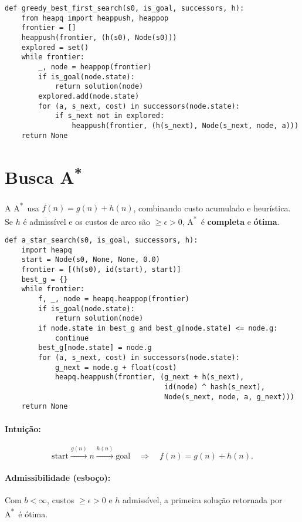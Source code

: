 \documentclass[9pt,a4paper]{extarticle}
\newcommand{\Astar}{A\textsuperscript{*}}
\begin{document}
\begin{lstlisting}
def greedy_best_first_search(s0, is_goal, successors, h):
    from heapq import heappush, heappop
    frontier = []
    heappush(frontier, (h(s0), Node(s0)))
    explored = set()
    while frontier:
        _, node = heappop(frontier)
        if is_goal(node.state):
            return solution(node)
        explored.add(node.state)
        for (a, s_next, cost) in successors(node.state):
            if s_next not in explored:
                heappush(frontier, (h(s_next), Node(s_next, node, a)))
    return None
\end{lstlisting}

\section{Busca \Astar}

A \Astar\ usa $f(n)=g(n)+h(n)$, combinando custo acumulado e heurística.
Se $h$ é admissível e os custos de arco são $\ge \epsilon>0$, \Astar\ é \textbf{completa} e \textbf{ótima}.

\begin{lstlisting}
def a_star_search(s0, is_goal, successors, h):
    import heapq
    start = Node(s0, None, None, 0.0)
    frontier = [(h(s0), id(start), start)]
    best_g = {}
    while frontier:
        f, _, node = heapq.heappop(frontier)
        if is_goal(node.state):
            return solution(node)
        if node.state in best_g and best_g[node.state] <= node.g:
            continue
        best_g[node.state] = node.g
        for (a, s_next, cost) in successors(node.state):
            g_next = node.g + float(cost)
            heapq.heappush(frontier, (g_next + h(s_next),
                                      id(node) ^ hash(s_next),
                                      Node(s_next, node, a, g_next)))
    return None
\end{lstlisting}

\paragraph{Intuição:}
\[
\text{start} \xrightarrow{g(n)} n \xrightarrow{h(n)} \text{goal}
\quad \Rightarrow \quad f(n) = g(n) + h(n).
\]

\paragraph{Admissibilidade (esboço):}
Com $b<\infty$, custos $\ge \epsilon>0$ e $h$ admissível, a primeira solução retornada por \Astar\ é ótima.
\end{document}
